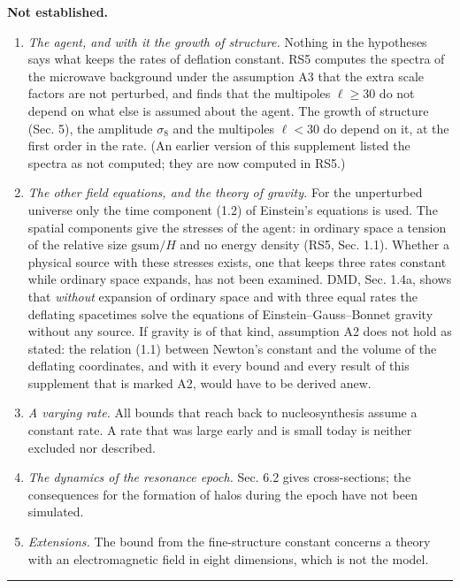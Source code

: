\documentclass[
  10pt,
]{article}
\providecommand{\tightlist}{%
  \setlength{\itemsep}{0pt}\setlength{\parskip}{0pt}}
\begin{document}
\textbf{Not established.}

\begin{enumerate}
\def\labelenumi{\arabic{enumi}.}
\tightlist
\item
  \emph{The agent, and with it the growth of structure.} Nothing in the
  hypotheses says what keeps the rates of deflation constant. RS5
  computes the spectra of the microwave background under the assumption
  A3 that the extra scale factors are not perturbed, and finds that the
  multipoles \(\ell\ge30\) do not depend on what else is assumed about
  the agent. The growth of structure (Sec. 5), the amplitude
  \(\sigma_8\) and the multipoles \(\ell<30\) do depend on it, at the
  first order in the rate. (An earlier version of this supplement listed
  the spectra as not computed; they are now computed in RS5.)
\item
  \emph{The other field equations, and the theory of gravity.} For the
  unperturbed universe only the time component (1.2) of Einstein's
  equations is used. The spatial components give the stresses of the
  agent: in ordinary space a tension of the relative size
  \(\mathrm{gsum}/H\) and no energy density (RS5, Sec. 1.1). Whether a
  physical source with these stresses exists, one that keeps three rates
  constant while ordinary space expands, has not been examined. DMD,
  Sec. 1.4a, shows that \emph{without} expansion of ordinary space and
  with three equal rates the deflating spacetimes solve the equations of
  Einstein--Gauss--Bonnet gravity without any source. If gravity is of
  that kind, assumption A2 does not hold as stated: the relation (1.1)
  between Newton's constant and the volume of the deflating coordinates,
  and with it every bound and every result of this supplement that is
  marked A2, would have to be derived anew.
\item
  \emph{A varying rate.} All bounds that reach back to nucleosynthesis
  assume a constant rate. A rate that was large early and is small today
  is neither excluded nor described.
\item
  \emph{The dynamics of the resonance epoch.} Sec. 6.2 gives
  cross-sections; the consequences for the formation of halos during the
  epoch have not been simulated.
\item
  \emph{Extensions.} The bound from the fine-structure constant concerns
  a theory with an electromagnetic field in eight dimensions, which is
  not the model.
\end{enumerate}

\begin{center}\rule{0.5\linewidth}{0.5pt}\end{center}
\end{document}
